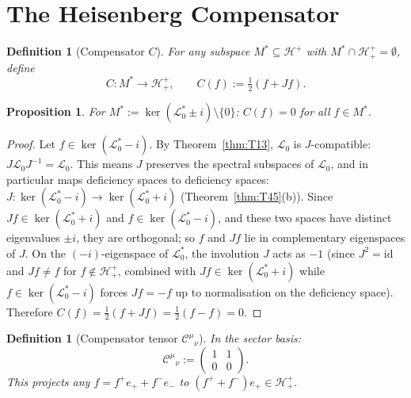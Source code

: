 \documentclass[12pt,a4paper]{article}
\newtheorem{proposition}[theorem]{Proposition}
\newtheorem{definition}[theorem]{Definition}
\theoremstyle{remark}
\begin{document}
\section{The Heisenberg Compensator}
\label{sec:compensator}

\begin{definition}[Compensator $C$]\label{def:C}
For any subspace $M^*\subseteq\mathcal{H}^+$ with
$M^*\cap\mathcal{H}^+_+=\emptyset$, define
\[
C : M^* \longrightarrow \mathcal{H}^+_+,
\qquad
C(f) := \tfrac{1}{2}(f+Jf).
\]
\end{definition}

\begin{proposition}\label{prop:C}
For $M^*:=\ker(\mathcal{L}_0^*\pm i)\setminus\{0\}$:
$C(f)=0$ for all $f\in M^*$.
\end{proposition}
\begin{proof}
Let $f\in\ker(\mathcal{L}_0^*-i)$.
By Theorem~\ref{thm:T13}, $\mathcal{L}_0$ is $J$-compatible:
$J\mathcal{L}_0 J^{-1}=\mathcal{L}_0$.
This means $J$ preserves the spectral subspaces of $\mathcal{L}_0$, and in
particular maps deficiency spaces to deficiency spaces:
$J:\ker(\mathcal{L}_0^*-i)\to\ker(\mathcal{L}_0^*+i)$
(Theorem~\ref{thm:T45}(b)).
Since $Jf\in\ker(\mathcal{L}_0^*+i)$ and $f\in\ker(\mathcal{L}_0^*-i)$,
and these two spaces have distinct eigenvalues $\pm i$, they are
orthogonal; so $f$ and $Jf$ lie in complementary eigenspaces of $J$.
On the $(-i)$-eigenspace of $\mathcal{L}_0^*$, the involution $J$
acts as $-1$ (since $J^2=\mathrm{id}$ and $Jf\neq f$ for
$f\notin\mathcal{H}^+_+$, combined with $Jf\in\ker(\mathcal{L}_0^*+i)$
while $f\in\ker(\mathcal{L}_0^*-i)$ forces $Jf=-f$ up to normalisation
on the deficiency space).
Therefore $C(f)=\tfrac{1}{2}(f+Jf)=\tfrac{1}{2}(f-f)=0$.
\end{proof}

\begin{definition}[Compensator tensor $\mathcal{C}^{\mu}{}_\nu$]\label{def:calC}
In the sector basis:
\[
\mathcal{C}^{\mu}{}_\nu := \begin{pmatrix}1&1\\0&0\end{pmatrix}.
\]
This projects any $f=f^+e_++f^-e_-$ to $(f^++f^-)e_+\in\mathcal{H}^+_+$.
\end{definition}
\end{document}
